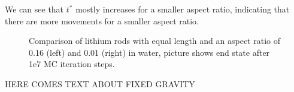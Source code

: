 We can see that $t^*$ mostly increases for a smaller aspect ratio, indicating that there are more movements for a smaller aspect ratio. 
\begin{figure}
  \begin{minipage}[t]{0.45\textwidth}
  \end{minipage}
  \hfill
  \begin{minipage}[t]{0.45\textwidth}
  \end{minipage}
  \caption{Comparison of lithium rods with equal length and an aspect ratio of 0.16 (left) and 0.01 (right) in water, picture shows end state after 1e7 MC iteration steps.}
  \label{fig:asp_length}
\end{figure}
HERE COMES TEXT ABOUT FIXED GRAVITY

